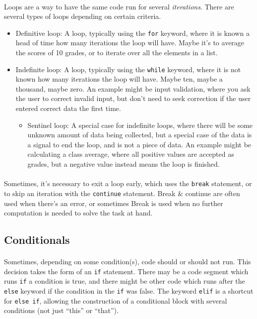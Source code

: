 \documentclass[letter,10pt]{article}
\begin{document}
\paragraph{}Loops are a way to have the same code run for several \textit{iterations}. There are several types of loops depending on certain criteria.
\begin{itemize}
    \item Definitive loop: A loop, typically using the \verb|for| keyword, where it is known a head of time how many iterations the loop will have. Maybe it's to average the scores of 10 grades, or to iterate over all the elements in a list.
    \item Indefinite loop: A loop, typically using the \verb|while| keyword, where it is not known how many iterations the loop will have. Maybe ten, maybe a thousand, maybe zero. An example might be input validation, where you ask the user to correct invalid input, but don't need to seek correction if the user entered correct data the first time.
    \begin{itemize}
        \item Sentinel loop: A special case for indefinite loops, where there will be some unknown amount of data being collected, but a special case of the data is a signal to end the loop, and is not a piece of data. An example might be calculating a class average, where all positive values are accepted as grades, but a negative value instead means the loop is finished.
    \end{itemize}
\end{itemize}

\paragraph{}Sometimes, it's necessary to exit a loop early, which uses the \verb|break| statement, or to skip an iteration with the \verb|continue| statement. Break \& continue are often used when there's an error, or sometimes Break is used when no further computation is needed to solve the task at hand.

\subsection{Conditionals}
\paragraph{}Sometimes, depending on some condition(s), code should or should not run. This decision takes the form of an \verb|if| statement. There may be a code segment which runs \verb|if| a condition is true, and there might be other code which runs after the \verb|else| keyword if the condition in the \verb|if| was false. The keyword \verb|elif| is a shortcut for \verb|else if|, allowing the construction of a conditional block with several conditions (not just ``this'' or ``that'').
\end{document}
